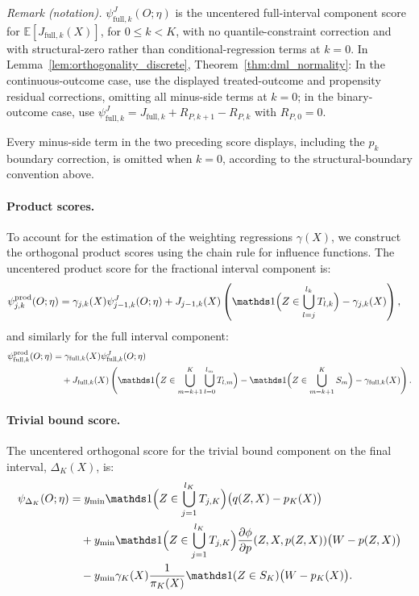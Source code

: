 \noindent\textit{Remark (notation).} $\psi_{\text{full},k}^{J}(O;\eta)$ is the uncentered full-interval component score for $\mathbb E[J_{\text{full},k}(X)]$, for $0\leq k<K$, with no quantile-constraint correction and with structural-zero rather than conditional-regression terms at $k=0$. In Lemma~\ref{lem:orthogonality_discrete}, Theorem~\ref{thm:dml_normality}: In the continuous-outcome case, use the displayed treated-outcome and propensity residual corrections, omitting all minus-side terms at $k=0$; in the binary-outcome case, use $\psi_{\text{full},k}^{J}=J_{\text{full},k}+R_{P,k+1}-R_{P,k}$ with $R_{P,0}=0$.


Every minus-side term in the two preceding score displays, including the $p_k$ boundary correction, is omitted when $k=0$, according to the structural-boundary convention above.

\paragraph{Product scores.} To account for the estimation of the weighting regressions $\gamma(X)$, we construct the orthogonal product scores using the chain rule for influence functions. The uncentered product score for the fractional interval component is:
\begin{align*}
    \psi_{j,k}^{\text{prod}}(O; \eta) &= \gamma_{j,k}(X) \psi_{j-1,k}^J(O; \eta) + J_{j-1,k}(X) \left( \indicator\Big(Z \in \bigcup_{l=j}^{l_k} T_{l,k}\Big) - \gamma_{j,k}(X) \right),
\end{align*}
and similarly for the full interval component:
\begin{align*}
    \psi_{\text{full},k}^{\text{prod}}(O; \eta) &= \gamma_{\text{full},k}(X) \psi_{\text{full},k}^J(O; \eta) \\
    &\quad + J_{\text{full},k}(X) \left( \indicator\Big(Z \in \bigcup_{m=k+1}^K \bigcup_{l=0}^{l_m} T_{l,m}\Big) - \indicator\Big(Z \in \bigcup_{m=k+1}^K S_m\Big) - \gamma_{\text{full},k}(X) \right).
\end{align*}

\paragraph{Trivial bound score.} The uncentered orthogonal score for the trivial bound component on the final interval, $\Delta_K(X)$, is:
\begin{align*}
    \psi_{\Delta_K}(O; \eta) &= y_{\min} \indicator\Big(Z \in \bigcup_{j=1}^{l_K} T_{j,K}\Big) \big( q(Z,X) - p_K(X) \big) \\
    &\quad + y_{\min} \indicator\Big(Z \in \bigcup_{j=1}^{l_K} T_{j,K}\Big) \frac{\partial \phi}{\partial p}(Z,X, p(Z,X)) \big( W - p(Z,X) \big) \\
    &\quad - y_{\min} \gamma_K(X) \frac{1}{\pi_K(X)} \indicator(Z \in S_K) \big( W - p_K(X) \big).
\end{align*}


